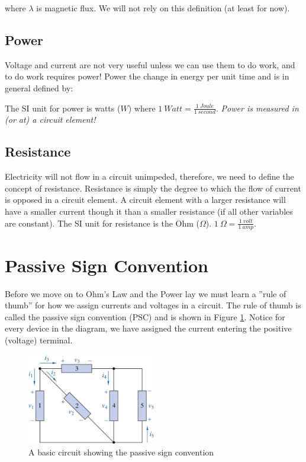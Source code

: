 \documentclass{handout}
\begin{document}
where $\lambda$ is magnetic flux.  We will not rely on this definition (at least for now).

\subsection{Power}
Voltage and current are not very useful unless we can use them to do work, and to do work requires power!  Power the change in energy per unit time and is in general defined by:

The SI unit for power is watts ($W$) where $1\ Watt = \frac{1\ Joule}{1\ second}$. {\em Power is measured in (or at) a circuit element!}

\subsection{Resistance}
Electricity will not flow in a circuit unimpeded, therefore, we need to define the concept of resistance.  Resistance is simply the degree to which the flow of current is opposed in a circuit element.  A circuit element with a larger resistance will have a smaller current though it than a smaller resistance (if all other variables are constant).  The SI unit for resistance is the Ohm ($\Omega$).  $1 \ \Omega = \frac{1\ volt}{1\ amp}$.

\newpage
\pagebreak
\clearpage

\section{Passive Sign Convention}
Before we move on to Ohm's Law and the Power lay we must learn a ''rule of thumb'' for how we assign currents and voltages in a circuit.  The rule of thumb is called the passive sign convention (PSC) and is shown in Figure \ref{fig: PSC}.  Notice for every device in the diagram, we have assigned the current entering the positive (voltage) terminal.

\begin{figure}[h t b]
\centering
\includegraphics[width=0.5\textwidth]{Passive_Sign_Convention.jpg}
\caption{A basic circuit showing the passive sign convention}
\label{fig: PSC}
\end{figure}
\end{document}
